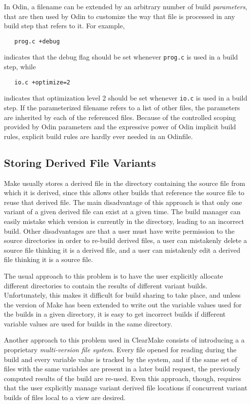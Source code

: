 \documentclass[hidelinks]{report}
\newcommand{\ex}{\tt}   %
\begin{document}
In Odin, a filename can be extended by an arbitrary number of build
{\em parameters}, that are then used by Odin to customize the way
that file is processed in any build step that refers to it.
For example,
\begin{verbatim}
   prog.c +debug
\end{verbatim}
indicates that the debug flag should be set whenever {\ex prog.c}
is used in a build step, while
\begin{verbatim}
   io.c +optimize=2
\end{verbatim}
indicates that optimization level 2 should be set whenever {\ex io.c}
is used in a build step.
If the parameterized filename refers to a list of other files,
the parameters are inherited by each of the referenced files.
Because of the controlled scoping provided by Odin parameters
and the expressive power of Odin implicit build rules,
explicit build rules are hardly ever needed in an Odinfile.

\subsection{Storing Derived File Variants}

Make usually stores a derived file in the directory containing the source
file from which it is derived,
since this allows other builds that reference the source file
to reuse that derived file.
The main disadvantage of this approach is that only
one variant of a given derived file can exist at a given time.
The build manager can easily mistake which version is
currently in the directory, leading to an incorrect build.
Other disadvantages are that a user must have write permission
to the source directories in order to re-build derived files,
a user can mistakenly delete a source file thinking it is a derived file,
and a user can mistakenly edit a derived file thinking it is a source file.

The usual approach to this problem is to have the user explicitly
allocate different directories to contain the results of
different variant builds.
Unfortunately, this makes it difficult for build sharing to take place,
and unless the version of Make has been extended to write out
the variable values used for the builds in a given directory,
it is easy to get incorrect builds if different variable values are
used for builds in the same directory.

Another approach to this problem used in
ClearMake\cite{ClearCase} consists of introducing a
a proprietary {\em multi-version file system}.
Every file opened for reading during the build and every variable value
is tracked by the system, and if the same set of files with the same
variables are present in a later build request,
the previously computed results of the build are re-used.
Even this approach, though,
requires that the user explicitly manage variant derived file locations
if concurrent variant builds of files local to a view are desired.
\end{document}
